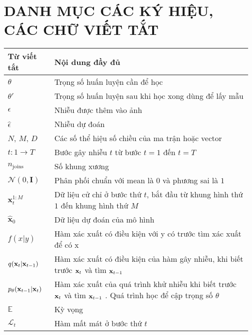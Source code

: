 
\pagebreak
{}
{}
\section*{\textbf{ \Large DANH MỤC CÁC KÝ HIỆU, CÁC CHỮ VIẾT TẮT}}

\begin{center}
\begin{tabular}{|p{3cm}|p{10cm}|}
\hline
\textbf{Từ viết tắt} & \textbf{Nội dung đầy đủ} \\
\hline
$\theta$ & Trọng số huấn luyện cần để học \\
\hline
$\theta'$ & Trọng số huấn luyện sau khi học xong dùng để lấy mẫu \\
\hline
$\epsilon$ & Nhiễu được thêm vào ảnh \\
\hline
$\hat{\epsilon}$ & Nhiễu dự đoán\\
\hline
$N$, $M$, $D$ & Các số thể hiệu số chiều của ma trận hoặc vector \\
\hline
$t: 1 \rightarrow T$ & Bước gây nhiễu $t$ từ bước $t=1$ đến $t=T$ \\
\hline
$n_{\operatorname{joins}}$ & Số khung xương \\
\hline
$\mathcal{N}(0, \mathbf{I})$ & Phân phối chuẩn với mean là $0$ và phương sai là $1$ \\
\hline
$\mathbf{x}_{t}^{1:M}$ & Dữ liệu cử chỉ ở bước thứ $t$, bắt đầu từ khung hình thứ $1$ đến khung hình thứ $M$ \\
\hline
$\hat{\mathbf{x}}_0$ &  Dữ liệu dự đoán của mô hình \\
\hline
$f(x | y)$ & Hàm xác xuất có điều kiện với y có trước tìm xác xuất để có x \\
\hline
$q(\mathbf{x}_t | \mathbf{x}_{t-1})$ & Hàm xác xuất có điều kiện của hàm gây nhiễu, khi biết trước $\mathbf{x}_t$ và tìm $\mathbf{x}_{t-1}$  \\
\hline
$p_{\theta} (\mathbf{x}_{t-1} | \mathbf{x}_{t})$ & Hàm xác xuất của quá trình khử nhiễu khi biết trước $\mathbf{x}_{t}$ và tìm $\mathbf{x}_{t-1}$ . Quá trình học để cập trọng số $\theta$   \\
\hline
$\mathbb{E}$ & Kỳ vọng \\
\hline
$\mathcal{L}_t$ & Hàm mất mát ở bước thứ $t$ \\
\hline
\end{tabular}
\end{center}


\pagebreak
